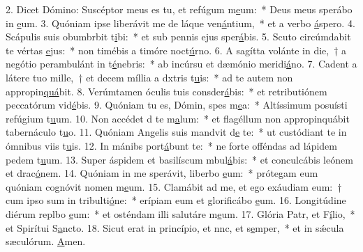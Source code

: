 2. Dicet Dómino: Suscéptor meus es tu, et refúgum m\uline{e}um:~* Deus meus sperábo in \uline{e}um.
3. Quóniam ipse liberávit me de láque ven\uline{á}ntium,~* et a verbo \uline{á}spero.
4. Scápulis suis obumbrbit t\uline{i}bi:~* et sub pennis ejus sper\uline{á}bis.
5. Scuto circúmdabit te vértas \uline{e}jus:~* non timébis a timóre noct\uline{ú}rno.
6. A sagítta volánte in die,~† a negótio perambulánt in t\uline{é}nebris:~* ab incúrsu et dæmónio meridi\uline{á}no.
7. Cadent a látere tuo mille,~† et decem míllia a dxtris t\uline{u}is:~* ad te autem non appropin\uline{quá}bit.
8. Verúmtamen óculis tuis consder\uline{á}bis:~* et retributiónem peccatórum vid\uline{é}bis.
9. Quóniam tu es, Dómin, spes m\uline{e}a:~* Altíssimum posuísti refúgium t\uline{u}um.
10. Non accédet d te m\uline{a}lum:~* et flagéllum non appropinquábit tabernáculo t\uline{u}o.
11. Quóniam Angelis suis mandvit d\uline{e} te:~* ut custódiant te in ómnibus viis t\uline{u}is.
12. In mánibs port\uline{á}bunt te:~* ne forte offéndas ad lápidem pedem t\uline{u}um.
13. Super áspidem et basilíscum mbul\uline{á}bis:~* et conculcábis leónem et drac\uline{ó}nem.
14. Quóniam in me sperávit, liberbo \uline{e}um:~* prótegam eum quóniam cognóvit nomen m\uline{e}um.
15. Clamábit ad me, et ego exáudiam eum:~† cum ipso sum in tribulti\uline{ó}ne:~* erípiam eum et glorificábo \uline{e}um.
16. Longitúdine diérum replbo \uline{e}um:~* et osténdam illi salutáre m\uline{e}um.
17. Glória Patr, et F\uline{í}lio,~* et Spirítui S\uline{a}ncto.
18. Sicut erat in princípio, et nnc, et s\uline{e}mper,~* et in sǽcula sæculórum. \uline{A}men.
